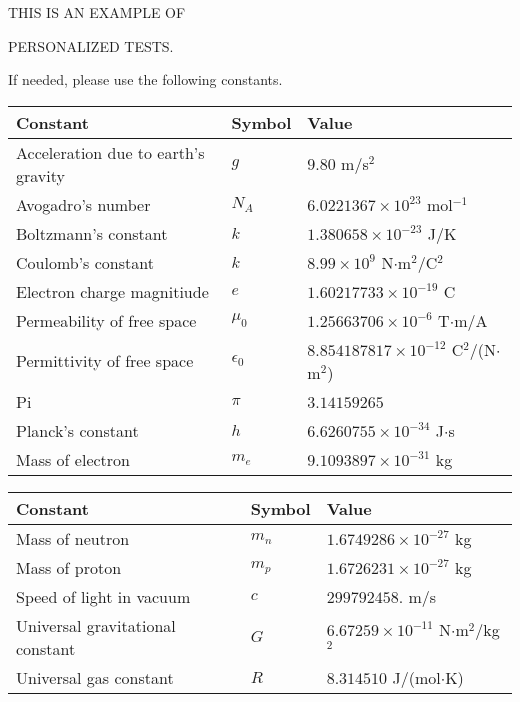 \documentclass[12pt]{article}
\begin{document}
   
 \vspace{0.2in}
 
 
{\Huge  THIS IS AN EXAMPLE OF}
 
{\Huge  PERSONALIZED TESTS. }
 
If needed, please use the following constants.
 
 
 
\noindent\begin{tabular}{|l|l|l|}
\hline
Constant & Symbol & Value \\
\hline
Acceleration due to earth's gravity &
$g$ &
 $ 9.80 $
m/s$^2$ \\
\hline
Avogadro's number &
$N_A$ &
 $ 6.0221367 \times 10^{23} $
mol$^{-1}$ \\
\hline
Boltzmann's constant &
$k$ &
 $ 1.380658 \times 10^{-23} $
J/K \\
\hline
Coulomb's constant &
$k$ &
 $ 8.99 \times 10^{9} $
N$\cdot $m$^2$/C$^2$ \\
\hline
Electron charge magnitiude &
$e$ &
 $ 1.60217733 \times 10^{-19} $
C \\
\hline
Permeability of free space &
$\mu _0$ &
 $ 1.25663706 \times 10^{-6} $
T$\cdot $m/A \\
\hline
Permittivity of free space &
$\epsilon _0$ &
 $ 8.854187817 \times 10^{-12} $
C$^2$/(N$\cdot $m$^2$) \\
\hline
Pi &
$\pi$ &
 $ 3.14159265 $
$ $ \\
\hline
Planck's constant &
$h$ &
 $ 6.6260755 \times 10^{-34} $
J$\cdot $s \\
\hline
Mass of electron &
$m_e$ &
 $ 9.1093897 \times 10^{-31} $
kg \\
\hline
\end{tabular}
 
 
\noindent\begin{tabular}{|l|l|l|}
\hline
Constant & Symbol & Value \\
\hline
Mass of neutron &
$m_n$ &
 $ 1.6749286 \times 10^{-27} $
kg \\
\hline
Mass of proton &
$m_p$ &
 $ 1.6726231 \times 10^{-27} $
kg \\
\hline
Speed of light in vacuum &
$c$ &
 $ 299792458. $
m/s \\
\hline
Universal gravitational constant &
$G$ &
 $ 6.67259 \times 10^{-11} $
N$\cdot $m$^2$/kg$^2$ \\
\hline
Universal gas constant &
$R$ &
 $ 8.314510 $
J/(mol$\cdot $K) \\
\hline
\end{tabular}
 
\end{document}
